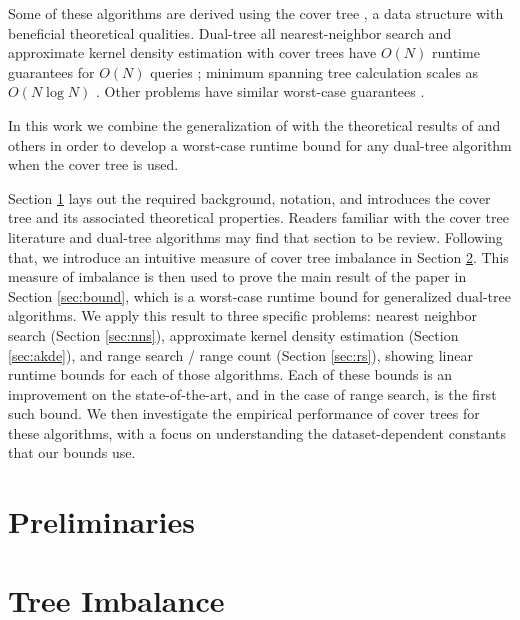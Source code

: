 \documentclass[twoside,11pt]{article} %
\begin{document}
Some of these algorithms are derived using the cover tree \citep{langford2006}, a
data structure with beneficial theoretical qualities.  Dual-tree all
nearest-neighbor search and approximate kernel density estimation with cover
trees have $O(N)$ runtime guarantees for $O(N)$ queries \citep{ram2009}; minimum
spanning tree calculation scales as $O(N \log N)$ \citep{march2010euclidean}.
Other problems have similar worst-case guarantees \citep{curtin2014dual,
march2013multi}.

In this work we combine the generalization of \citet{curtin2013tree} with the
theoretical results of \citet{langford2006} and others in order to develop a
worst-case runtime bound for any dual-tree algorithm when the cover tree is
used.

Section \ref{sec:preliminaries} lays out the required background, notation, and
introduces the cover tree and its associated theoretical properties.  Readers
familiar with the cover tree literature and dual-tree algorithms
\citep[especially][]{curtin2013tree} may find that section to be review.
Following that, we introduce an intuitive measure of cover tree imbalance in
Section \ref{sec:imbalance}.  This measure of imbalance is then used to prove
the main result of the paper in Section \ref{sec:bound}, which is a worst-case
runtime bound for generalized dual-tree algorithms.  We apply this result to
three specific problems: nearest neighbor search (Section \ref{sec:nns}),
approximate kernel density estimation (Section \ref{sec:akde}), and range search
/ range count (Section \ref{sec:rs}), showing linear runtime bounds for each of
those algorithms.  Each of these bounds is an improvement on the
state-of-the-art, and in the case of range search, is the first such bound.  We
then investigate the empirical performance of cover trees for these algorithms,
with a focus on understanding the dataset-dependent constants that our bounds
use.

\section{Preliminaries}
\label{sec:preliminaries}



\section{Tree Imbalance}
\label{sec:imbalance}


\end{document}
